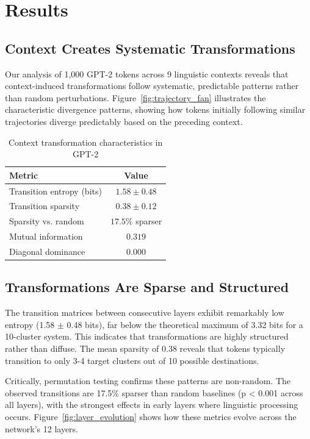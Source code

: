 
\section{Results}

\subsection{Context Creates Systematic Transformations}

Our analysis of 1,000 GPT-2 tokens across 9 linguistic contexts reveals that context-induced transformations follow systematic, predictable patterns rather than random perturbations. Figure~\ref{fig:trajectory_fan} illustrates the characteristic divergence patterns, showing how tokens initially following similar trajectories diverge predictably based on the preceding context.

\begin{table}[h]
\centering
\caption{Context transformation characteristics in GPT-2}
\label{tab:metrics}
\begin{tabular}{lc}
\hline
Metric & Value \\
\hline
Transition entropy (bits) & $1.58 \pm 0.48$ \\
Transition sparsity & $0.38 \pm 0.12$ \\
Sparsity vs. random & $17.5\%$ sparser \\
Mutual information & $0.319$ \\
Diagonal dominance & $0.000$ \\
\hline
\end{tabular}
\end{table}

\subsection{Transformations Are Sparse and Structured}

The transition matrices between consecutive layers exhibit remarkably low entropy (1.58 $\pm$ 0.48 bits), far below the theoretical maximum of 3.32 bits for a 10-cluster system. This indicates that transformations are highly structured rather than diffuse. The mean sparsity of 0.38 reveals that tokens typically transition to only 3-4 target clusters out of 10 possible destinations.

Critically, permutation testing confirms these patterns are non-random. The observed transitions are 17.5\% sparser than random baselines (p < 0.001 across all layers), with the strongest effects in early layers where linguistic processing occurs. Figure~\ref{fig:layer_evolution} shows how these metrics evolve across the network's 12 layers.

